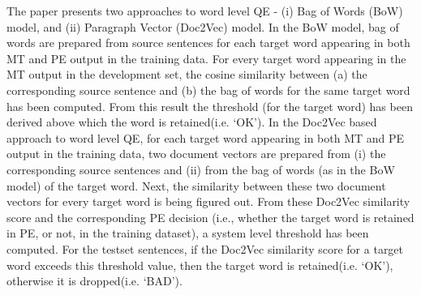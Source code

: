 The paper presents two approaches to word level QE - (i) Bag of Words (BoW) model, and (ii) Paragraph Vector (Doc2Vec) model. In the BoW model, bag of words are prepared from source sentences for each target word appearing in both MT and PE output in the training data. For every target word appearing in the MT output in the development set, the cosine similarity  between (a) the corresponding source sentence and (b) the bag of words for the same target word has been computed. From this result the threshold (for the target word) has been derived above which the word is retained(i.e. `OK'). In the Doc2Vec based approach to word level QE, for each target word appearing in both MT and PE output in the training data, two document vectors are prepared from (i) the corresponding source sentences and (ii) from the bag of words (as in the BoW model) of the target word. Next,  the similarity between these two document vectors for every target word is being figured out. From these Doc2Vec similarity score and the corresponding PE decision (i.e., whether the target word is retained in PE, or not, in the training dataset),  a system level threshold has been computed. For the testset sentences, if the Doc2Vec similarity score for a target word exceeds this threshold value, then the target word is retained(i.e. `OK'), otherwise it is dropped(i.e. `BAD').
